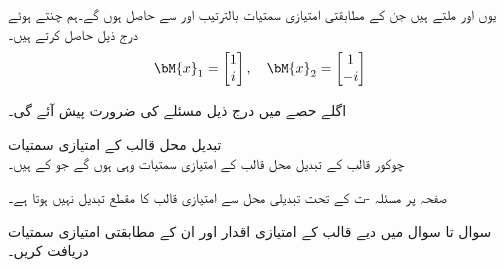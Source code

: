 یوں  اور  ملتے ہیں جن کے مطابقتی امتیازی سمتیات بالترتیب  اور  سے حاصل ہوں گے۔ہم  چنتے ہوئے درج ذیل حاصل کرتے ہیں۔
\begin{align*}
\bM{x}_1=\begin{bmatrix} 1\\i \end{bmatrix}, \quad \bM{x}_2=\begin{bmatrix} 1\\-i \end{bmatrix}
\end{align*}
 
اگلے حصے میں درج ذیل مسئلے کی ضرورت پیش آئے گی۔

\quad تبدیل محل قالب کے امتیازی سمتیات\\
چوکور قالب  کے تبدیل محل قالب  کے امتیازی سمتیات وہی ہوں گے جو   کے ہیں۔ 

صفحہ  پر مسئلہ -ت کے تحت تبدیلی محل سے امتیازی قالب کا مقطع تبدیل نہیں ہوتا ہے۔ 

سوال  تا سوال  میں دیے قالب کے  امتیازی اقدار اور ان کے مطابقتی امتیازی سمتیات دریافت کریں۔

